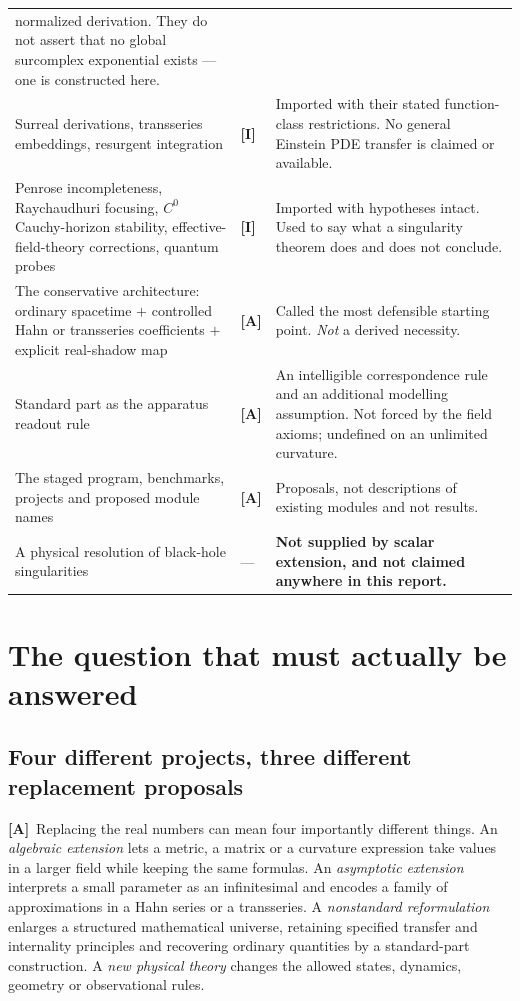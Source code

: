 \documentclass[11pt,letterpaper]{article}
\numberwithin{equation}{section}
\theoremstyle{definition}
\theoremstyle{remark}
\newcommand{\TA}{\textcolor{TierA}{\textsf{\bfseries[A]}}}
\newcommand{\TI}{\textcolor{TierI}{\textsf{\bfseries[I]}}}
\begin{document}
\begin{longtable}{@{}L{0.28\textwidth}L{0.09\textwidth}L{0.55\textwidth}@{}}
normalized derivation. They do not assert that no global surcomplex exponential
exists --- one is constructed here. \\
\addlinespace
Surreal derivations, transseries embeddings, resurgent integration &
\TI &
Imported with their stated function-class restrictions. No general Einstein PDE
transfer is claimed or available. \\
\addlinespace
Penrose incompleteness, Raychaudhuri focusing, $C^{0}$ Cauchy-horizon
stability, effective-field-theory corrections, quantum probes &
\TI &
Imported with hypotheses intact. Used to say what a singularity theorem does
and does not conclude. \\
\addlinespace
The conservative architecture: ordinary spacetime $+$ controlled Hahn or
transseries coefficients $+$ explicit real-shadow map &
\TA &
Called the most defensible starting point. \emph{Not} a derived necessity. \\
\addlinespace
Standard part as the apparatus readout rule &
\TA &
An intelligible correspondence rule and an additional modelling assumption.
Not forced by the field axioms; undefined on an unlimited curvature. \\
\addlinespace
The staged program, benchmarks, projects and proposed module names &
\TA &
Proposals, not descriptions of existing modules and not results. \\
\addlinespace
A physical resolution of black-hole singularities &
--- &
\textbf{Not supplied by scalar extension, and not claimed anywhere in this
report.} \\
\end{longtable}

\section{The question that must actually be answered}
\label{phys:sec:question}

\subsection{Four different projects, three different replacement proposals}
\label{phys:sub:projects}

\TA\ Replacing the real numbers can mean four importantly different things.
An \emph{algebraic extension} lets a metric, a matrix or a curvature expression
take values in a larger field while keeping the same formulas. An
\emph{asymptotic extension} interprets a small parameter as an infinitesimal
and encodes a family of approximations in a Hahn series or a transseries. A
\emph{nonstandard reformulation} enlarges a structured mathematical universe,
retaining specified transfer and internality principles and recovering ordinary
quantities by a standard-part construction. A \emph{new physical theory}
changes the allowed states, dynamics, geometry or observational rules.
\end{document}
